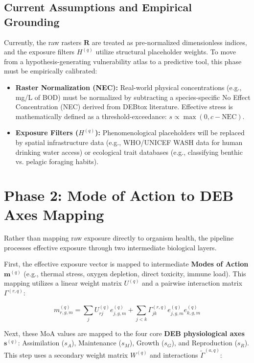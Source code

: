 \documentclass[11pt,a4paper]{article}
\begin{document}
\subsection*{Current Assumptions and Empirical Grounding}
Currently, the raw rasters $\bm{R}$ are treated as pre-normalized dimensionless indices, and the exposure filters $H^{(q)}$ utilize structural placeholder weights. To move from a hypothesis-generating vulnerability atlas to a predictive tool, this phase must be empirically calibrated:
\begin{itemize}
    \item \textbf{Raster Normalization (NEC):} Real-world physical concentrations (e.g., mg/L of BOD) must be normalized by subtracting a species-specific No Effect Concentration (NEC) derived from DEBtox literature. Effective stress is mathematically defined as a threshold-exceedance: $s \propto \max(0, c - \text{NEC})$.
    \item \textbf{Exposure Filters ($H^{(q)}$):} Phenomenological placeholders will be replaced by spatial infrastructure data (e.g., WHO/UNICEF WASH data for human drinking water access) or ecological trait databases (e.g., classifying benthic vs. pelagic foraging habits).
\end{itemize}

\section{Phase 2: Mode of Action to DEB Axes Mapping}

Rather than mapping raw exposure directly to organism health, the pipeline processes effective exposure through two intermediate biological layers. 

First, the effective exposure vector is mapped to intermediate \textbf{Modes of Action} $\bm{m}^{(q)}$ (e.g., thermal stress, oxygen depletion, direct toxicity, immune load). This mapping utilizes a linear weight matrix $U^{(q)}$ and a pairwise interaction matrix $\Gamma^{(r,q)}$:

\begin{equation}
 m_{r, g, m}^{(q)} = \sum_{j} U_{rj}^{(q)} e_{j, g, m}^{(q)} + \sum_{j<k} \Gamma_{jk}^{(r,q)} e_{j,g,m}^{(q)} e_{k,g,m}^{(q)}
\end{equation}

Next, these MoA values are mapped to the four core \textbf{DEB physiological axes} $\bm{s}^{(q)}$: Assimilation ($s_A$), Maintenance ($s_M$), Growth ($s_G$), and Reproduction ($s_R$). This step uses a secondary weight matrix $W^{(q)}$ and interactions $\tilde{\Gamma}^{(a,q)}$:
\end{document}
